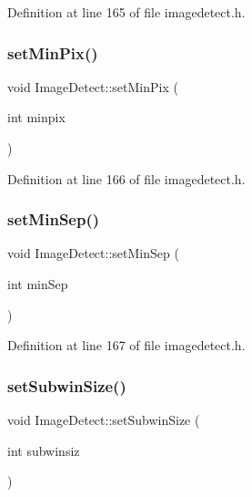 Definition at line 165 of file imagedetect.\+h.

\mbox{\label{class_image_detect_a11d8d8f15063dd4694136420f61caa9f}} 
\subsubsection{\texorpdfstring{setMinPix()}{setMinPix()}}
{\footnotesize\ttfamily void Image\+Detect\+::set\+Min\+Pix (\begin{DoxyParamCaption}\item[{int}]{minpix }\end{DoxyParamCaption})\hspace{0.3cm}{\ttfamily [inline]}}



Definition at line 166 of file imagedetect.\+h.

\mbox{\label{class_image_detect_a76ef2d1c6072b5375a6071e8af461e7b}} 
\subsubsection{\texorpdfstring{setMinSep()}{setMinSep()}}
{\footnotesize\ttfamily void Image\+Detect\+::set\+Min\+Sep (\begin{DoxyParamCaption}\item[{int}]{min\+Sep }\end{DoxyParamCaption})\hspace{0.3cm}{\ttfamily [inline]}}



Definition at line 167 of file imagedetect.\+h.

\mbox{\label{class_image_detect_a4a210d6197477252ce4e50fc79b890d5}} 
\subsubsection{\texorpdfstring{setSubwinSize()}{setSubwinSize()}}
{\footnotesize\ttfamily void Image\+Detect\+::set\+Subwin\+Size (\begin{DoxyParamCaption}\item[{int}]{subwinsiz }\end{DoxyParamCaption})}



